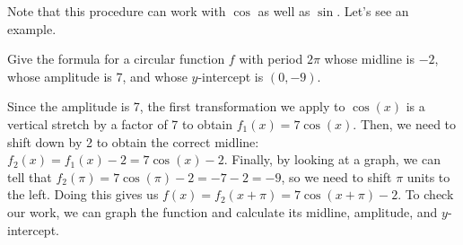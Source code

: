 \documentclass{ximera}
\begin{document}
Note that this procedure can work with $\cos$ as well as $\sin$. Let's see an example.

\begin{example}
Give the formula for a circular function $f$ with period $2\pi$ whose midline is $-2$, whose amplitude is 7, and whose $y$-intercept is $(0, -9)$.
\begin{explanation}
Since the amplitude is 7, the first transformation we apply to $\cos(x)$ is a vertical stretch by a factor of 7 to obtain $f_1(x) = 7\cos(x)$. Then, we need to shift down by 2 to obtain the correct midline: $f_2(x) = f_1(x) - 2 = 7\cos(x) - 2$. Finally, by looking at a graph, we can tell that $f_2(\pi) = 7\cos(\pi) - 2 = -7 - 2 = -9$, so we need to shift $\pi$ units to the left. Doing this gives us $f(x) = f_2(x + \pi) = 7\cos(x + \pi) - 2$. To check our work, we can graph the function and calculate its midline, amplitude, and $y$-intercept. 
\end{explanation}
\end{example} 
\end{document}
